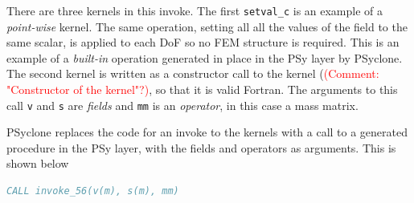 \documentclass[times]{elsarticle}
\begin{document}
There are three kernels in this invoke. The first \verb+setval_c+ is
an example of a {\em point-wise} kernel. The same operation, setting all
all the values of the field to the same scalar, is applied
to each DoF so no FEM structure is required.
This is an example of a {\em built-in} operation generated in place in 
the PSy layer by PSyclone. The second
kernel is written as a constructor call to the kernel (\textcolor{red}{(Comment: "Constructor of the kernel"?)}, so that it is
valid Fortran. The arguments to this call \verb+v+ and \verb+s+ are
{\em fields} and \verb+mm+ is an {\em operator}, in this case a mass
matrix.

PSyclone replaces the code for an invoke to the kernels with a call to a
generated procedure in the PSy layer, with the fields and operators as
arguments. This is shown below
\begin{lstlisting}[language=Fortran,caption={Code fragment showing the
generated Algorithm layer code},label={lst:invoke_56}]
 CALL invoke_56(v(m), s(m), mm)
\end{lstlisting}
\end{document}
